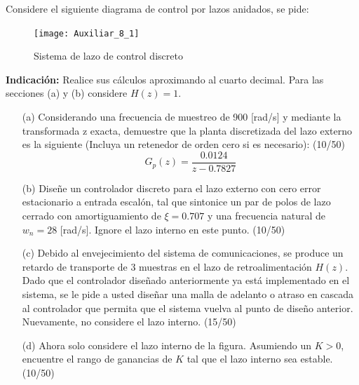 \documentclass[
  11pt,
  letterpaper,
   addpoints,
  ]{exam}
\begin{document}
\begin{questions}
    \question Considere el siguiente diagrama de control por lazos anidados, se pide:

    \begin{figure}[h!]
        \centering
        \texttt{[image: Auxiliar\_8\_1]} %
        \caption{Sistema de lazo de control discreto}
    \end{figure}
    
    \noindent \textbf{Indicación:} Realice sus cálculos aproximando al cuarto decimal. Para las secciones (a) y (b) considere $H(z) = 1$.
    
    \begin{enumerate}
        \item[(a)] Considerando una frecuencia de muestreo de 900 [rad/s] y mediante la transformada z exacta, demuestre que la planta discretizada del lazo externo es la siguiente (Incluya un retenedor de orden cero si es necesario): (10/50)
        \[
        G_p(z) = \frac{0.0124}{z - 0.7827}
        \]
        
        \item[(b)] Diseñe un controlador discreto para el lazo externo con cero error estacionario a entrada escalón, tal que sintonice un par de polos de lazo cerrado con amortiguamiento de $\xi = 0.707$ y una frecuencia natural de $w_n = 28$ [rad/s]. Ignore el lazo interno en este punto. (10/50)
        
        \item[(c)] Debido al envejecimiento del sistema de comunicaciones, se produce un retardo de transporte de 3 muestras en el lazo de retroalimentación $H(z)$. Dado que el controlador diseñado anteriormente ya está implementado en el sistema, se le pide a usted diseñar una malla de adelanto o atraso en cascada al controlador que permita que el sistema vuelva al punto de diseño anterior. Nuevamente, no considere el lazo interno. (15/50)
        
        \item[(d)] Ahora solo considere el lazo interno de la figura. Asumiendo un $K > 0$, encuentre el rango de ganancias de $K$ tal que el lazo interno sea estable. (10/50)
    
    \end{enumerate}
\begin{solution}

\end{solution}
\end{questions}
\end{document}

